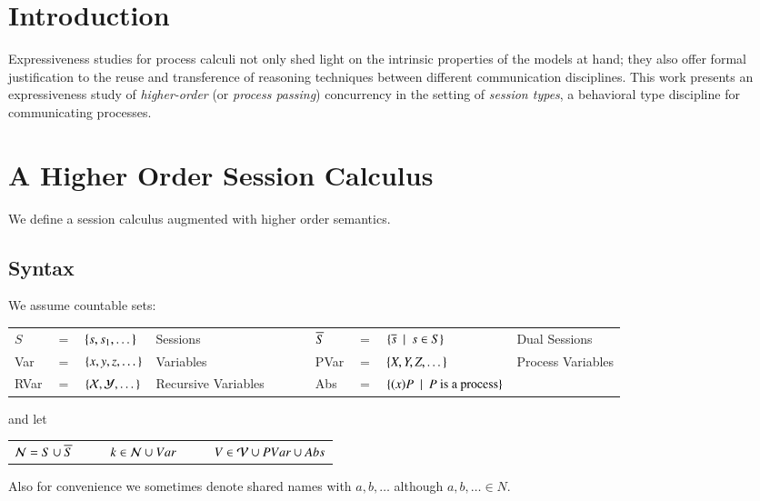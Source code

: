 \section*{Introduction}
Expressiveness studies for process calculi not only shed light on the intrinsic properties of the models at hand; they
also offer formal justification to the reuse and transference of reasoning techniques between different communication disciplines.
This work presents an expressiveness study of \emph{higher-order} (or \emph{process passing}) concurrency in the setting of \emph{session types}, 
a behavioral type discipline for communicating processes. 


\section{A Higher Order Session Calculus}

We define a session calculus augmented with higher order semantics.

\subsection{Syntax}

We assume countable sets:

\begin{tabular}{lcllclcll}
	$S$ &$=$& $\{s, s_1, \dots\}$ & Sessions
	&$\qquad$&
	$\overline{S}$ &$=$& $\{\overline{s} \ \ |\ \  s \in S\}$ & Dual Sessions
	\\

	Var &$=$& $\{x,y,z, \dots\}$ & Variables
	&$\qquad$&
	PVar &$=$& $\{X, Y, Z, \dots\}$ & Process Variables\\

	RVar &$=$& $\{\mathcal{X}, \mathcal{Y}, \dots\}$ & Recursive Variables
	&$\qquad$&
	Abs &$=$& $\{(x)P \ \ |\ \  P \textrm{ is a process}\}$
\end{tabular}

\noi and let

\begin{tabular}{c}
	$\mathcal{N} = S \cup \overline{S} \quad \qquad k \in \mathcal{N} \cup Var \quad \qquad V \in \mathcal{V} \cup PVar \cup Abs$
\end{tabular}

\noi Also for convenience we sometimes denote shared names with $a, b, \dots$ although $a,b,\dots \in N$.

